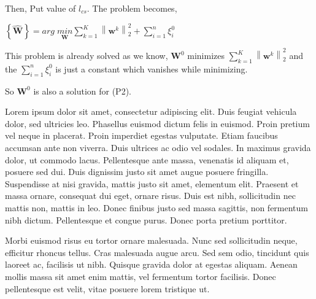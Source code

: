 \documentclass[a4paper,11pt]{article}
\begin{document}
\begin{mlsolution}
Then, Put value of \begin{math} l_{cs}\end{math}. The problem becomes,

\begin{math}\left \{ \widehat{\textbf{W}} \right \} = \underset{\textbf{}}{arg} \; \underset{  \textbf{W}}{min} \sum_{k=1}^{K} \left \| \textbf{w}^{k} \right \|^{2}_{2} + \sum_{i=1}^{n} \xi_{i}^{0}\end{math}

This problem is already solved as we know, \begin{math}\textbf{W}^{0}\end{math} minimizes  \begin{math}\sum_{k=1}^{K} \left \| \textbf{w}^{k} \right \|^{2}_{2}\end{math} and the \begin{math}\sum_{i=1}^{n} \xi_{i}^{0}\end{math} is just a constant which vanishes while minimizing.

So \begin{math}\textbf{W}^{0}\end{math} is also a solution for (P2).



 Lorem ipsum dolor sit amet, consectetur adipiscing elit. Duis feugiat vehicula dolor, sed ultricies leo. Phasellus euismod dictum felis in euismod. Proin pretium vel neque in placerat. Proin imperdiet egestas vulputate. Etiam faucibus accumsan ante non viverra. Duis ultrices ac odio vel sodales. In maximus gravida dolor, ut commodo lacus. Pellentesque ante massa, venenatis id aliquam et, posuere sed dui. Duis dignissim justo sit amet augue posuere fringilla. Suspendisse at nisi gravida, mattis justo sit amet, elementum elit. Praesent et massa ornare, consequat dui eget, ornare risus. Duis est nibh, sollicitudin nec mattis non, mattis in leo. Donec finibus justo sed massa sagittis, non fermentum nibh dictum. Pellentesque et congue purus. Donec porta pretium porttitor.

Morbi euismod risus eu tortor ornare malesuada. Nunc sed sollicitudin neque, efficitur rhoncus tellus. Cras malesuada augue arcu. Sed sem odio, tincidunt quis laoreet ac, facilisis ut nibh. Quisque gravida dolor at egestas aliquam. Aenean mollis massa sit amet enim mattis, vel fermentum tortor facilisis. Donec pellentesque est velit, vitae posuere lorem tristique ut. 
\end{mlsolution}
\end{document}
